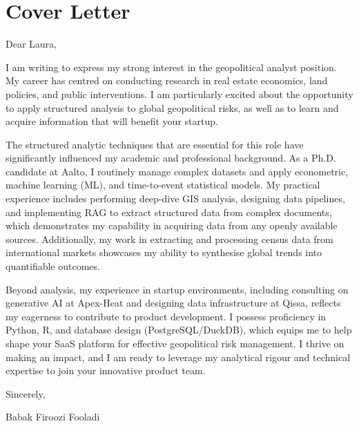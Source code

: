 \documentclass[a4paper,11pt]{article}
\begin{document}
	
	

	\section{Cover Letter}

Dear Laura,

I am writing to express my strong interest in the geopolitical analyst position. My career has centred on conducting research in real estate economics, land policies, and public interventions. I am particularly excited about the opportunity to apply structured analysis to global geopolitical risks, as well as to learn and acquire information that will benefit your startup.

The structured analytic techniques that are essential for this role have significantly influenced my academic and professional background. As a Ph.D. candidate at Aalto, I routinely manage complex datasets and apply econometric, machine learning (ML), and time-to-event statistical models. My practical experience includes performing deep-dive GIS analysis, designing data pipelines, and implementing RAG to extract structured data from complex documents, which demonstrates my capability in acquiring data from any openly available sources. Additionally, my work in extracting and processing census data from international markets showcases my ability to synthesise global trends into quantifiable outcomes.

Beyond analysis, my experience in startup environments, including consulting on generative AI at Apex-Heat and designing data infrastructure at Qissa, reflects my eagerness to contribute to product development. I possess proficiency in Python, R, and database design (PostgreSQL/DuckDB), which equips me to help shape your SaaS platform for effective geopolitical risk management. I thrive on making an impact, and I am ready to leverage my analytical rigour and technical expertise to join your innovative product team.

Sincerely,

Babak Firoozi Fooladi
	
\end{document}
